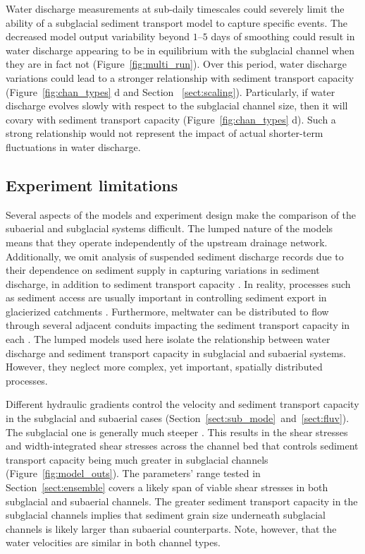 \documentclass[tc, manuscript]{copernicus}
\begin{document}
Water discharge measurements at sub-daily timescales could severely limit the ability of a subglacial sediment transport model to capture specific events.
The decreased model output variability beyond $1$--$5$ days of smoothing could result in water discharge appearing to be in equilibrium with the subglacial channel when they are in fact not (Figure~\ref{fig:multi_run}).
Over this period, water discharge variations could lead to a stronger relationship with sediment transport capacity (Figure~\ref{fig:chan_types} d and Section ~\ref{sect:scaling}).
Particularly, if water discharge evolves slowly with respect to the subglacial channel size, then it will covary with sediment transport capacity (Figure~\ref{fig:chan_types} d).
Such a strong relationship would not represent the impact of actual shorter-term fluctuations in water discharge.

\subsection{Experiment limitations}

Several aspects of the models and experiment design make the comparison of the subaerial and subglacial systems difficult. 
The lumped nature of the models means that they operate independently of the upstream drainage network.
Additionally, we omit analysis of suspended sediment discharge records due to their dependence on sediment supply in capturing variations in sediment discharge, in addition to sediment transport capacity \citep[e.g.][]{delaney2019}.
In reality, processes such as sediment access are usually important in controlling sediment export in glacierized catchments \citep[e.g.][]{herman2015,vergara2022}.
Furthermore, meltwater can be distributed to flow through several adjacent conduits impacting the sediment transport capacity in each \citep[e.g.][]{werder2013,hewitt2019,delaney2023}.
The lumped models used here isolate the relationship between water discharge and sediment transport capacity in subglacial and subaerial systems. 
However, they neglect more complex, yet important, spatially distributed processes.

Different hydraulic gradients control the velocity and sediment transport capacity in the subglacial and subaerial cases (Section~\ref{sect:sub_mode}~and~\ref{sect:fluv}). 
The subglacial one is generally much steeper \citep{alley1997}.
This results in the shear stresses and width-integrated shear stresses across the channel bed that controls sediment transport capacity being much greater in subglacial channels (Figure~\ref{fig:model_outs}).
The parameters' range tested in Section~\ref{sect:ensemble} covers a likely span of viable shear stresses in both subglacial and subaerial channels.
The greater sediment transport capacity in the subglacial channels implies that sediment grain size underneath subglacial channels is likely larger than subaerial counterparts.
Note, however, that the water velocities are similar in both channel types.
\end{document}
